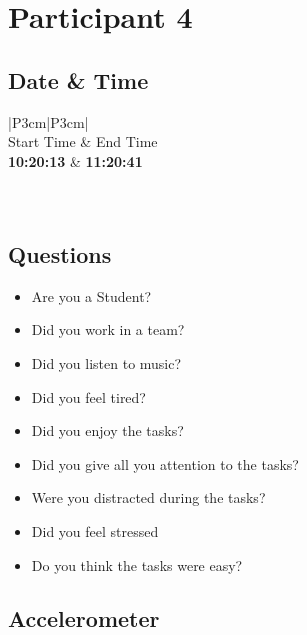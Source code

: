 \section{Participant 4}


\subsection{Date \& Time}
\begin{table}[ht]
  \begin{tabular}{|P{3cm}|P{3cm}|}
	    	\\ \hline
    Start Time      			& End Time   					\\ \hline
   \textbf{10:20:13} 	& \textbf{11:20:41}    	\\ \hline
       						\\ \hline
    			\\ \hline
  \end{tabular}
  \newline\newline
  \caption{P4: Date and Time}\label{dandt4}
\end{table}

\subsection{Questions}
\begin{itemize} 
  \item[\Checkmark] Are you a Student?
  \item[\XSolidBrush] Did you work in a team?
  \item[\XSolidBrush] Did you listen to music?
  \item[\Checkmark] Did you feel tired?
  \item[\Checkmark] Did you enjoy the tasks?
  \item[\XSolidBrush] Did you give all you attention to the tasks?
  \item[\Checkmark] Were you distracted during the tasks?
  \item[\Checkmark] Did you feel stressed
  \item[\XSolidBrush] Do you think the tasks were easy?  
\end{itemize}


\FloatBarrier
\newpage

\subsection{Accelerometer}


